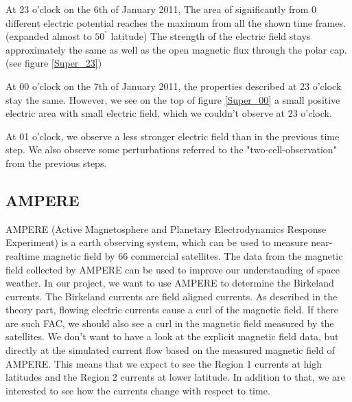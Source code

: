 \documentclass[10pt,a4paper]{article}
\begin{document}
At 23 o'clock on the 6th of January 2011, The area of significantly from 0 different electric potential reaches the maximum from all the shown time frames. (expanded almost to $50^{°}$ latitude) The strength of the electric field stays approximately the same as well as the open magnetic flux through the polar cap. (see figure \ref{Super_23})

At 00 o'clock on the 7th of January 2011, the properties described at 23 o'clock stay the same. However, we see on the top of figure \ref{Super_00} a small positive electric area with small electric field, which we couldn't observe at 23 o'clock.

At 01 o'clock, we observe a 
less stronger electric field than in the previous time step. We also observe some perturbations referred to the "two-cell-observation" from the previous steps. 


\subsection{AMPERE \label{0_CHAPTER_AMPERE}}
AMPERE (Active Magnetosphere and Planetary Electrodynamics Response Experiment) is a earth observing system, which can be used to measure near-realtime magnetic field by 66 commercial satellites.
The data from the magnetic field collected by AMPERE can be used to improve our understanding of space weather.
In our project, we want to use AMPERE to determine the Birkeland currents. The Birkeland currents are field aligned currents. As described in the theory part, flowing electric currents cause a curl of the magnetic field. If there are such FAC, we should also see a curl in the magnetic field measured by the satellites.
We don't want to have a look at the explicit magnetic field data, but directly at the simulated current flow based on the measured magnetic field of AMPERE. This means that we expect to see the Region 1 currents at high latitudes and the Region 2 currents at lower latitude. 
In addition to that, we are interested to see how the currents change with respect to time. 
\end{document}
